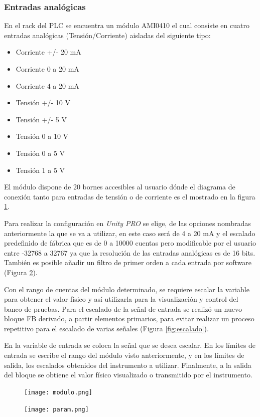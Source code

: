 \subsubsection{Entradas analógicas}
En el rack del PLC se encuentra un módulo AMI0410 el cual consiste en cuatro entradas analógicas (Tensión/Corriente) aisladas del siguiente tipo:
\begin{itemize}
	\item Corriente +/- 20 mA
\item 	Corriente 0 a 20 mA
\item 	Corriente 4 a 20 mA
\item 	Tensión +/- 10 V
\item 	Tensión +/- 5 V
\item 	Tensión 0 a 10 V
\item 	Tensión 0 a 5 V
\item 	Tensión 1 a 5 V
	
\end{itemize}

El módulo dispone de 20 bornes accesibles al usuario dónde el diagrama de conexión tanto para entradas de tensión o de corriente es el mostrado en la figura \ref{fig:modulo}.

Para realizar la configuración en \textit{Unity PRO} se elige, de las opciones nombradas anteriormente la que se va a utilizar, en este caso será de 4 a 20 mA y el escalado predefinido de fábrica que es de 0 a 10000 cuentas pero modificable por el usuario entre -32768 a 32767 ya que la resolución de las entradas analógicas es de 16 bits. También es posible añadir un filtro de primer orden a cada entrada por software (Figura \ref{fig:param}).

Con el rango de cuentas del módulo determinado, se requiere escalar la variable para obtener el valor físico y así utilizarla para la visualización y control del banco de pruebas.
Para el escalado de la señal de entrada se realizó un nuevo bloque FB derivado, a partir elementos primarios, para evitar realizar un proceso repetitivo para el escalado de varias señales (Figura \ref{fig:escalado}).

En la variable de entrada se coloca la señal que se desea escalar. En los límites de entrada se escribe el rango del módulo visto anteriormente, y en los límites de salida, los escalados obtenidos del instrumento a utilizar. Finalmente, a la salida del bloque se obtiene el valor físico visualizado o transmitido por el instrumento.

\begin{figure}[H]
	\centering
	\texttt{[image: modulo.png]}
	\label{fig:modulo}
\end{figure}
\begin{figure}[H]
	\centering
	\texttt{[image: param.png]}
	\label{fig:param}
\end{figure}

